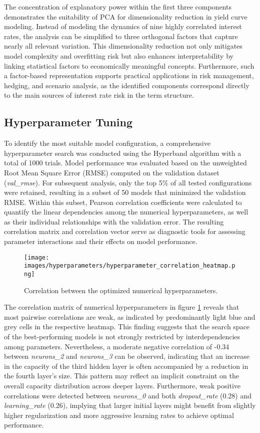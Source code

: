 The concentration of explanatory power within the first three components demonstrates the suitability of PCA for dimensionality reduction in yield curve modeling. Instead of modeling the dynamics of nine highly correlated interest rates, the analysis can be simplified to three orthogonal factors that capture nearly all relevant variation. This dimensionality reduction not only mitigates model complexity and overfitting risk but also enhances interpretability by linking statistical factors to economically meaningful concepts. Furthermore, such a factor-based representation supports practical applications in risk management, hedging, and scenario analysis, as the identified components correspond directly to the main sources of interest rate risk in the term structure.

\subsection{Hyperparameter Tuning}
To identify the most suitable model configuration, a comprehensive hyperparameter search was conducted using the Hyperband algorithm with a total of 1000 trials. Model performance was evaluated based on the unweighted Root Mean Square Error (RMSE) computed on the validation dataset (\textit{val\_rmse}). For subsequent analysis, only the top 5\% of all tested configurations were retained, resulting in a subset of 50 models that minimized the validation RMSE. Within this subset, Pearson correlation coefficients were calculated to quantify the linear dependencies among the numerical hyperparameters, as well as their individual relationships with the validation error. The resulting correlation matrix and correlation vector serve as diagnostic tools for assessing parameter interactions and their effects on model performance.

\begin{figure}[H]
	\centering
	\texttt{[image: images/hyperparameters/hyperparameter\_correlation\_heatmap.png]}
	\caption{Correlation between the optimized numerical hyperparameters.}
	\label{fig:hyperparameter_correlation}
\end{figure}

The correlation matrix of numerical hyperparameters in figure \ref{fig:hyperparameter_correlation} reveals that most pairwise correlations are weak, as indicated by predominantly light blue and grey cells in the respective heatmap. This finding suggests that the search space of the best-performing models is not strongly restricted by interdependencies among parameters. Nevertheless, a moderate negative correlation of -0.34 between \textit{neurons\_2} and \textit{neurons\_3} can be observed, indicating that an increase in the capacity of the third hidden layer is often accompanied by a reduction in the fourth layer’s size. This pattern may reflect an implicit constraint on the overall capacity distribution across deeper layers. Furthermore, weak positive correlations were detected between \textit{neurons\_0} and both \textit{dropout\_rate} (0.28) and \textit{learning\_rate} (0.26), implying that larger initial layers might benefit from slightly higher regularization and more aggressive learning rates to achieve optimal performance.

